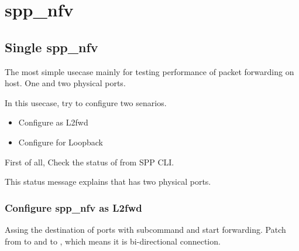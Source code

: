 \documentclass[a4paper,11pt,openany,oneside,english]{sphinxmanual}
\begin{document}
\section{spp\_nfv}
\label{\detokenize{usecases/spp_nfv:spp-nfv}}\label{\detokenize{usecases/spp_nfv:spp-usecases-nfv}}\label{\detokenize{usecases/spp_nfv::doc}}

\subsection{Single spp\_nfv}
\label{\detokenize{usecases/spp_nfv:single-spp-nfv}}\label{\detokenize{usecases/spp_nfv:spp-usecases-nfv-single-spp-nfv}}
The most simple usecase mainly for testing performance of packet
forwarding on host.
One  and two physical ports.

In this usecase, try to configure two senarios.
\begin{itemize}
\item {} 
Configure  as L2fwd

\item {} 
Configure  for Loopback

\end{itemize}

First of all, Check the status of  from SPP CLI.

\begin{sphinxVerbatim}[commandchars=\\\{\},formatcom=\footnotesize]
\end{sphinxVerbatim}

This status message explains that  has two physical ports.


\subsubsection{Configure spp\_nfv as L2fwd}
\label{\detokenize{usecases/spp_nfv:configure-spp-nfv-as-l2fwd}}
Assing the destination of ports with  subcommand and
start forwarding.
Patch from  to  and  to ,
which means it is bi-directional connection.
\end{document}
